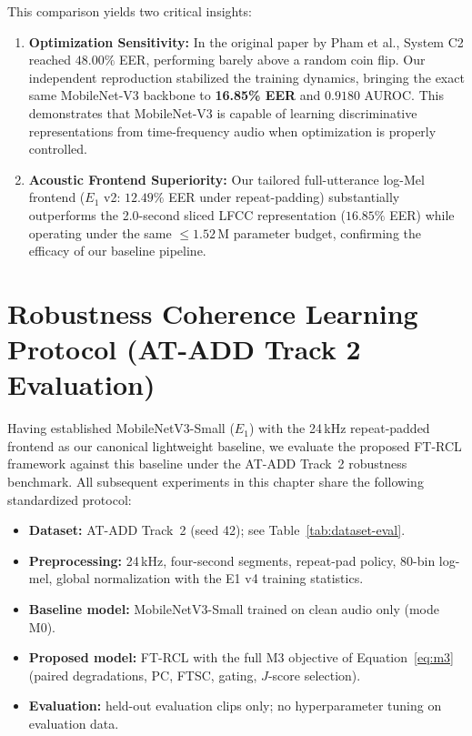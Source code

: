 This comparison yields two critical insights:
\begin{enumerate}
  \item \textbf{Optimization Sensitivity:} In the original paper by Pham et al., System C2 reached $48.00\%$ EER, performing barely above a random coin flip. Our independent reproduction stabilized the training dynamics, bringing the exact same MobileNet-V3 backbone to \textbf{16.85\% EER} and $0.9180$ AUROC. This demonstrates that MobileNet-V3 is capable of learning discriminative representations from time-frequency audio when optimization is properly controlled.
  \item \textbf{Acoustic Frontend Superiority:} Our tailored full-utterance log-Mel frontend ($E_1$ v2: $12.49\%$ EER under repeat-padding) substantially outperforms the 2.0-second sliced LFCC representation ($16.85\%$ EER) while operating under the same $\le 1.52\,\text{M}$ parameter budget, confirming the efficacy of our baseline pipeline.
\end{enumerate}

\section{Robustness Coherence Learning Protocol (AT-ADD Track 2 Evaluation)}
\label{sec:ftrcl-evaluation-protocol}

Having established MobileNetV3-Small ($E_1$) with the 24\,kHz repeat-padded frontend as our canonical lightweight baseline, we evaluate the proposed FT-RCL framework against this baseline under the AT-ADD Track~2 robustness benchmark. All subsequent experiments in this chapter share the following standardized protocol:
\begin{itemize}
  \item \textbf{Dataset:} AT-ADD Track~2 (seed 42); see Table~\ref{tab:dataset-eval}.
  \item \textbf{Preprocessing:} 24\,kHz, four-second segments, repeat-pad policy, 80-bin log-mel, global normalization with the E1 v4 training statistics.
  \item \textbf{Baseline model:} MobileNetV3-Small trained on clean audio only (mode M0).
  \item \textbf{Proposed model:} FT-RCL with the full M3 objective of Equation~\eqref{eq:m3} (paired degradations, PC, FTSC, gating, $J$-score selection).
  \item \textbf{Evaluation:} held-out evaluation clips only; no hyperparameter tuning on evaluation data.
\end{itemize}

